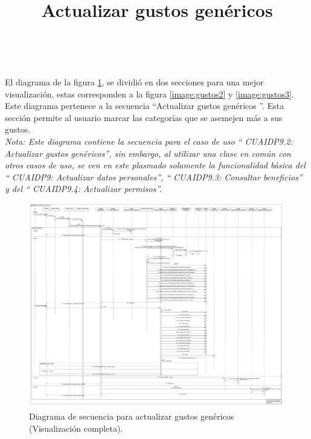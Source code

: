 \title{\textbf{Actualizar gustos genéricos}}
\\ \par
El diagrama de la figura \ref{image:gustos}, se dividió en dos secciones para una mejor visualización, estas corresponden a la figura \ref{image:gustos2} y \ref{image:gustos3}. Este diagrama pertenece a la secuencia ``Actualizar gustos genéricos ''. Esta sección permite al usuario marcar las categorías que se asemejen más a sus gustos.\\
\textit{Nota: Este diagrama contiene la secuencia para el caso de uso `` CUAIDP9.2: Actualizar gustos genéricos'', sin embargo, al utilizar una clase en común con otros casos de uso, se ven en este plasmado solamente la funcionalidad básica del `` CUAIDP9: Actualizar datos personales'', `` CUAIDP9.3: Consultar beneficios'' y del `` CUAIDP9.4: Actualizar permisos''.}
\FloatBarrier
\begin{figure}[htbp!]
		\centering
			\includegraphics[width=1.1 \textwidth]{imagenes/Diagramas_UserApp/Nuevos_diagramas/gustosGenericos}
		\caption{Diagrama de secuencia para actualizar gustos genéricos (Visualización completa).}
		\label{image:gustos}
\end{figure}
\FloatBarrier

